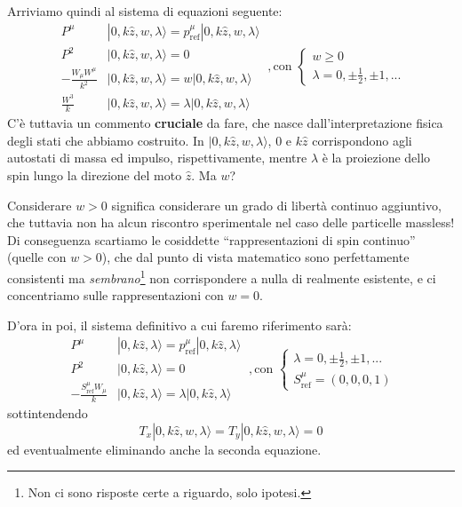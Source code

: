 \documentclass[../main.tex]{subfiles}
\begin{document}
Arriviamo quindi al sistema di equazioni seguente:
\[
{
\begin{aligned}
    P^\mu&|0, k\hat{z}, w, \lambda\rangle = p^\mu_\text{ref}|0, k\hat{z}, w, \lambda\rangle\\
    P^2&|0, k\hat{z}, w, \lambda\rangle = 0 \\
    -\frac{W_\mu W^\mu}{k^2}&|0, k\hat{z}, w, \lambda\rangle = w |0, k\hat{z}, w, \lambda\rangle\\
    \frac{W^3}{k}&|0, k\hat{z}, w, \lambda\rangle = \lambda |0, k\hat{z}, w, \lambda\rangle
\end{aligned}
}~,\text{con } 
\begin{cases}
    w\geq0\\
    \lambda = 0, \pm \frac{1}{2}, \pm1, ...
\end{cases}
\]
C'è tuttavia un commento \textbf{cruciale} da fare, che nasce dall'interpretazione fisica degli stati che abbiamo costruito. In $|0, k\hat{z}, w, \lambda\rangle$, $0$ e $k\hat{z}$ corrispondono agli autostati di massa ed impulso, rispettivamente, mentre $\lambda$ è la proiezione dello spin lungo la direzione del moto $\hat z$. Ma $w$? 

Considerare $w>0$ significa considerare un grado di libertà continuo aggiuntivo, che tuttavia non ha alcun riscontro sperimentale nel caso delle particelle massless! Di conseguenza scartiamo le cosiddette “rappresentazioni di spin continuo” (quelle con $w>0$), che dal punto di vista matematico sono perfettamente consistenti ma \textit{sembrano}\footnote{Non ci sono risposte certe a riguardo, solo ipotesi.} non corrispondere a nulla di realmente esistente, e ci concentriamo sulle rappresentazioni con $w=0$. 

D'ora in poi, il sistema definitivo a cui faremo riferimento sarà: 
\[
\boxed{
\begin{aligned}
    P^\mu&|0, k\hat{z}, \lambda\rangle = p^\mu_\text{ref}|0, k\hat{z}, \lambda\rangle\\
    P^2&|0, k\hat{z}, \lambda\rangle = 0 \\
    -\frac{S^\mu_\text{ref}W_\mu}{k}&|0, k\hat{z}, \lambda\rangle = \lambda |0, k\hat{z}, \lambda\rangle
\end{aligned}
}~,\text{con } 
\begin{cases}
    \lambda = 0, \pm \frac{1}{2}, \pm1, ... \\
    S^\mu_\text{ref} = (0,0,0,1)
\end{cases}
\]
sottintendendo 
\[
T_x|0, k\hat{z}, w, \lambda\rangle = T_y|0, k\hat{z}, w, \lambda\rangle = 0
\]
ed eventualmente eliminando anche la seconda equazione.
\end{document}
